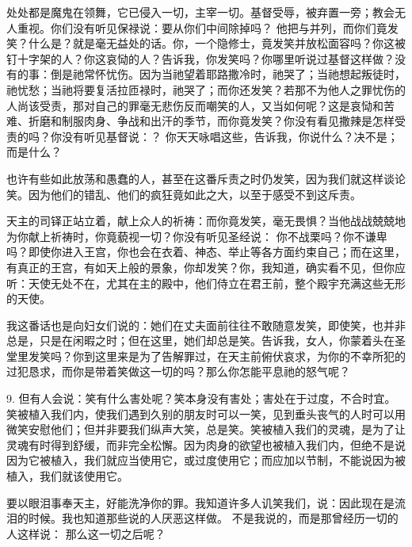 处处都是魔鬼在领舞，它已侵入一切，主宰一切。基督受辱，被弃置一旁；教会无人重视。你们没有听见保禄说：要从你们中间除掉吗？ 他把与并列，而你们竟发笑？什么是？就是毫无益处的话。你，一个隐修士，竟发笑并放松面容吗？你这被钉十字架的人？你这哀恸的人？告诉我，你发笑吗？你哪里听说过基督这样做？没有的事：倒是祂常怀忧伤。因为当祂望着耶路撒冷时，祂哭了；当祂想起叛徒时，祂忧愁；当祂将要复活拉匝禄时，祂哭了；而你还发笑？若那不为他人之罪忧伤的人尚该受责，那对自己的罪毫无悲伤反而嘲笑的人，又当如何呢？这是哀恸和苦难、折磨和制服肉身、争战和出汗的季节，而你竟发笑？你没有看见撒辣是怎样受责的吗？你没有听见基督说：？ 你天天咏唱这些，告诉我，你说什么？决不是；而是什么？\par

也许有些如此放荡和愚蠢的人，甚至在这番斥责之时仍发笑，因为我们就这样谈论笑。因为他们的错乱、他们的疯狂竟如此之大，以至于感受不到这斥责。\par

天主的司铎正站立着，献上众人的祈祷：而你竟发笑，毫无畏惧？当他战战兢兢地为你献上祈祷时，你竟藐视一切？你没有听见圣经说： 你不战栗吗？你不谦卑吗？即使你进入王宫，你也会在衣着、神态、举止等各方面约束自己；而在这里，有真正的王宫，有如天上般的景象，你却发笑？你，我知道，确实看不见，但你应听：天使无处不在，尤其在主的殿中，他们侍立在君王前，整个殿宇充满这些无形的天使。\par

我这番话也是向妇女们说的：她们在丈夫面前往往不敢随意发笑，即使笑，也并非总是，只是在闲暇之时；但在这里，她们却总是笑。告诉我，女人，你蒙着头在圣堂里发笑吗？你到这里来是为了告解罪过，在天主前俯伏哀求，为你的不幸所犯的过犯恳求，而你是带着笑做这一切的吗？那么你怎能平息祂的怒气呢？\par

9. 但有人会说：笑有什么害处呢？笑本身没有害处；害处在于过度，不合时宜。笑被植入我们内，使我们遇到久别的朋友时可以一笑，见到垂头丧气的人时可以用微笑安慰他们；但并非要我们纵声大笑，总是笑。笑被植入我们的灵魂，是为了让灵魂有时得到舒缓，而非完全松懈。因为肉身的欲望也被植入我们内，但绝不是说因为它被植入，我们就应当使用它，或过度使用它；而应加以节制，不能说因为被植入，我们就该使用它。\par

要以眼泪事奉天主，好能洗净你的罪。我知道许多人讥笑我们，说：因此现在是流泪的时候。我也知道那些说的人厌恶这样做。 不是我说的，而是那曾经历一切的人这样说： 那么这一切之后呢？\par


